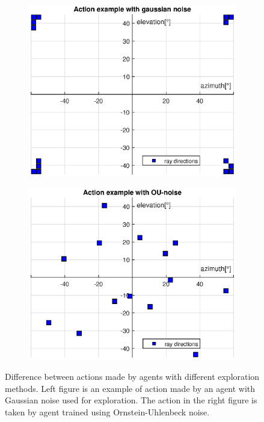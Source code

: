 \begin{figure}[H]
\begin{subfigure}[h]{0.5\linewidth}
\includegraphics[width=\linewidth]{fig/wrong_action.eps}
\end{subfigure}
\hfill
\begin{subfigure}[h]{0.5\linewidth}
\includegraphics[width=\linewidth]{fig/right_action.eps}
\end{subfigure}
\captionsetup{width=1\textwidth}
\caption[Difference between actions made by agents with different exploration methods]{Difference between actions made by agents with different exploration methods. Left figure is an example of action made by an agent with Gaussian noise used for exploration. The action in the right figure is taken by agent trained using Ornstein-Uhlenbeck noise.}
\label{fig:expdiff}
\end{figure}

